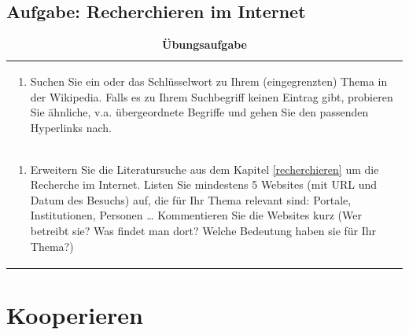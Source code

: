 \documentclass[]{book}
\providecommand{\tightlist}{%
  \setlength{\itemsep}{0pt}\setlength{\parskip}{0pt}}
\theoremstyle{definition}
\theoremstyle{definition}
\theoremstyle{definition}
\theoremstyle{remark}
\begin{document}
\section{Aufgabe: Recherchieren im
Internet}\label{aufgabe-recherchieren-im-internet}

\begin{longtable}[]{@{}l@{}}
\caption{\textbf{\label{tab:aufgabe3-test} Übungsaufgabe}}\tabularnewline
\toprule
\begin{minipage}[t]{0.97\columnwidth}\raggedright\strut
\begin{enumerate}
\def\labelenumi{\arabic{enumi}.}
\tightlist
\item
  Suchen Sie ein oder das Schlüsselwort zu Ihrem (eingegrenzten) Thema
  in der Wikipedia. Falls es zu Ihrem Suchbegriff keinen Eintrag gibt,
  probieren Sie ähnliche, v.a. übergeordnete Begriffe und gehen Sie den
  passenden Hyperlinks nach. \vspace{-6mm}
\end{enumerate}\strut
\end{minipage}\tabularnewline
\begin{minipage}[t]{0.97\columnwidth}\raggedright\strut
\begin{enumerate}
\def\labelenumi{\arabic{enumi}.}
\setcounter{enumi}{1}
\tightlist
\item
  Erweitern Sie die Literatursuche aus dem Kapitel \ref{recherchieren}
  um die Recherche im Internet. Listen Sie mindestens 5 Websites (mit
  URL und Datum des Besuchs) auf, die für Ihr Thema relevant sind:
  Portale, Institutionen, Personen \ldots{} Kommentieren Sie die
  Websites kurz (Wer betreibt sie? Was findet man dort? Welche Bedeutung
  haben sie für Ihr Thema?)
\end{enumerate}\strut
\end{minipage}\tabularnewline
\bottomrule
\end{longtable}

\hypertarget{kooperieren}{\chapter{Kooperieren}\label{kooperieren}}
\end{document}
